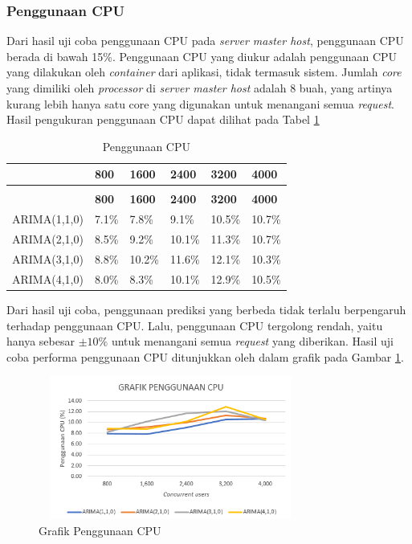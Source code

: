 \subsubsection{Penggunaan CPU}
Dari hasil uji coba penggunaan CPU pada \textit{server master host}, penggunaan CPU berada di bawah 15\%. Penggunaan CPU yang diukur adalah penggunaan CPU yang dilakukan oleh \textit{container} dari aplikasi, tidak termasuk sistem. Jumlah \textit{core} yang dimiliki oleh \textit{processor} di \textit{server master host} adalah 8 buah, yang artinya kurang lebih hanya satu core yang digunakan untuk menangani semua \textit{request}. Hasil pengukuran penggunaan CPU dapat dilihat pada Tabel \ref{penggunaancpu}

\begin{longtable}{|p{}|p{}|p{}|p{}|p{}|p{}|}
	\caption{Penggunaan CPU} \label{penggunaancpu} \\
	\hline
	& \textbf{800} & \textbf{1600} & \textbf{2400} & \textbf{3200} & \textbf{4000} \\ \hline
	\endfirsthead
	\caption[]{Penggunaan CPU} \\
	\hline
	& \textbf{800} & \textbf{1600} & \textbf{2400} & \textbf{3200} & \textbf{4000} \\ \hline
	\endhead
	\endfoot
	\endlastfoot
	
	ARIMA(1,1,0) & 7.1\% & 7.8\% & 9.1\% & 10.5\% & 10.7\% \\ \hline
	ARIMA(2,1,0) & 8.5\% & 9.2\% & 10.1\% & 11.3\% & 10.7\% \\ \hline
	ARIMA(3,1,0) & 8.8\% & 10.2\% & 11.6\% & 12.1\% & 10.3\% \\ \hline
	ARIMA(4,1,0) & 8.0\% & 8.3\% & 10.1\% & 12.9\% & 10.5\% \\ \hline
	
\end{longtable}

Dari hasil uji coba, penggunaan prediksi yang berbeda tidak terlalu berpengaruh terhadap penggunaan CPU. Lalu, penggunaan CPU tergolong rendah, yaitu hanya sebesar $\pm 10 \%$ untuk menangani semua \textit{request} yang diberikan. Hasil uji coba performa penggunaan CPU ditunjukkan oleh dalam grafik pada Gambar \ref{gcpuusage}.

\begin{figure}[H]
	\centering
	\includegraphics[width=8.7cm,height=4.7cm]{Images/C-5/cpuusage.png}
	\caption{Grafik Penggunaan CPU}
	\label{gcpuusage}
\end{figure}

